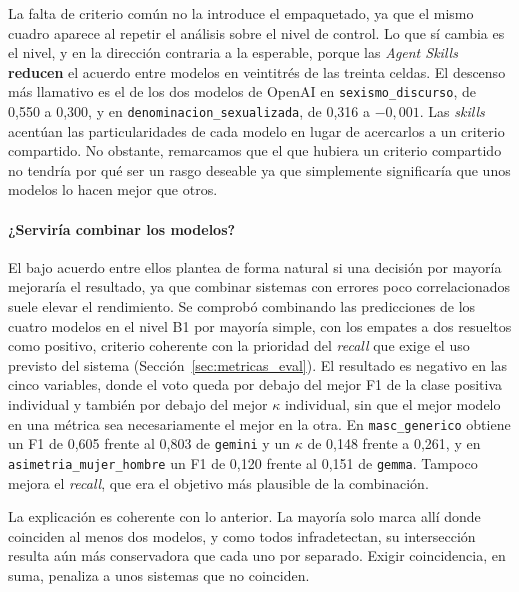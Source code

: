 La falta de criterio común no la introduce el empaquetado, ya que el mismo cuadro
aparece al repetir el análisis sobre el nivel de control. Lo que sí cambia es el
nivel, y en la dirección contraria a la esperable, porque las \textit{Agent Skills}
\textbf{reducen} el acuerdo entre modelos en veintitrés de las treinta celdas. El descenso más llamativo es el de los dos modelos de OpenAI en
\texttt{sexismo\_discurso}, de 0,550 a 0,300, y en \texttt{denominacion\_sexualizada},
de 0,316 a $-0,001$. Las \textit{skills} acentúan las particularidades de cada
modelo en lugar de acercarlos a un criterio compartido. No obstante, remarcamos que el que hubiera un criterio compartido no tendría por qué ser un rasgo deseable ya que simplemente significaría que unos modelos lo hacen mejor que otros.

\paragraph{¿Serviría combinar los modelos?} El bajo acuerdo entre ellos plantea de
forma natural si una decisión por mayoría mejoraría el resultado, ya que combinar
sistemas con errores poco correlacionados suele elevar el rendimiento. Se comprobó
combinando las predicciones de los cuatro modelos en el nivel B1 por mayoría
simple, con los empates a dos resueltos como positivo, criterio coherente con la
prioridad del \textit{recall} que exige el uso previsto del sistema
(Sección~\ref{sec:metricas_eval}). El resultado es negativo en las cinco variables,
donde el voto queda por debajo del mejor F1 de la clase positiva individual y también
por debajo del mejor $\kappa$ individual, sin que el mejor modelo en una métrica sea
necesariamente el mejor en la otra. En \texttt{masc\_generico} obtiene un F1 de 0,605 frente
al 0,803 de \texttt{gemini} y un $\kappa$ de 0,148 frente a 0,261, y en
\texttt{asimetria\_mujer\_hombre} un F1 de 0,120 frente al 0,151 de
\texttt{gemma}. Tampoco mejora el \textit{recall}, que era el objetivo más plausible de
la combinación.

La explicación es coherente con lo anterior. La mayoría solo marca allí donde
coinciden al menos dos modelos, y como todos infradetectan, su intersección resulta
aún más conservadora que cada uno por separado. Exigir coincidencia, en suma, penaliza
a unos sistemas que no coinciden.


